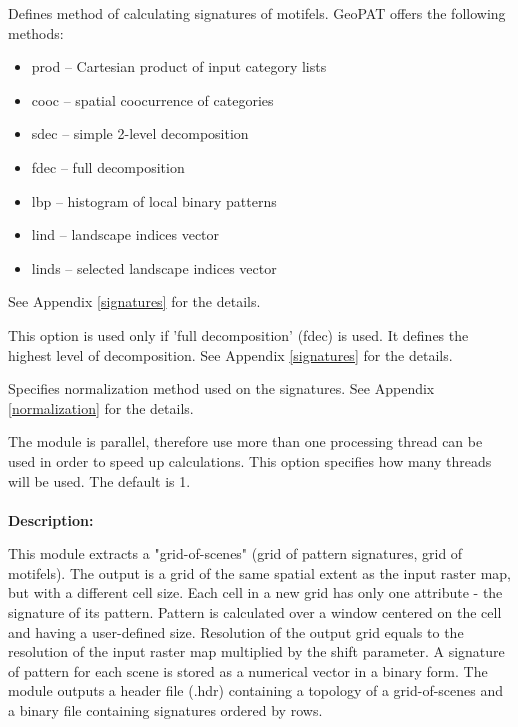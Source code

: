 
Defines method of calculating signatures of motifels. GeoPAT offers the following methods: 
\begin{itemize}
	\item prod -- Cartesian product of input category lists
	\item cooc -- spatial coocurrence of categories
	\item sdec -- simple 2-level decomposition
	\item fdec -- full decomposition
	\item lbp -- histogram of local binary patterns
	\item lind -- landscape indices vector
	\item linds -- selected landscape indices vector
\end{itemize}
See Appendix \ref{signatures} for the details.


This option is used only if 'full decomposition' (fdec) is used.
It defines the highest level of decomposition. See Appendix \ref{signatures} for the details.


Specifies normalization method used on the signatures. 
See Appendix \ref{normalization} for the details.


The module is parallel, therefore use more than one processing thread can be used in order to speed up calculations. 
This option specifies how many threads will be used. 
The default is 1.
\\\\

{\bf Description:}

This module extracts a "grid-of-scenes" (grid of pattern signatures, grid of motifels).
The output is a grid of the same spatial extent as the input raster map, but with a different cell size.
Each cell in a new grid has only one attribute - the signature of its pattern. 
Pattern is calculated over a window centered on the cell and having a user-defined size.
Resolution of the output grid equals to the resolution of the input raster map multiplied by the shift parameter. 
A signature of pattern for each scene is stored as a numerical vector in a binary form.
The module outputs a header file (.hdr) containing a topology of a grid-of-scenes and a binary file containing signatures ordered by rows.

